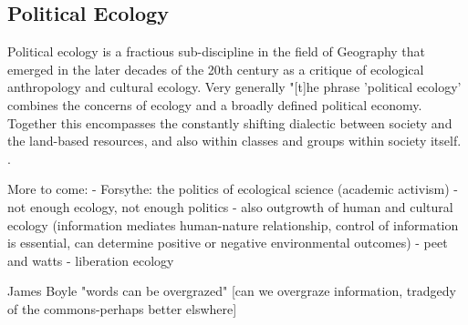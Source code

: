\subsection{Political Ecology}

Political ecology is a fractious sub-discipline in the field of Geography that emerged in the later decades of the 20th century as a critique of ecological anthropology and cultural ecology. Very generally "[t]he phrase 'political ecology' combines the concerns of ecology and a broadly defined political economy. Together this encompasses the constantly shifting dialectic between society and the land-based resources, and also within classes and groups within society itself. \citep[][p. 17]{blaikie_1987}. 

More to come:
- Forsythe: the politics of ecological science (academic activism) \citep{forsyth_2003}
- not enough ecology, not enough politics \citep{walker_2005,walker_2007}
- also outgrowth of human and cultural ecology (information mediates human-nature relationship, control of information is essential, can determine positive or negative environmental outcomes)
- peet and watts - liberation ecology \citep{peet_1996}

James Boyle "words can be overgrazed" [can we overgraze information, tradgedy of the commons-perhaps better elswhere]